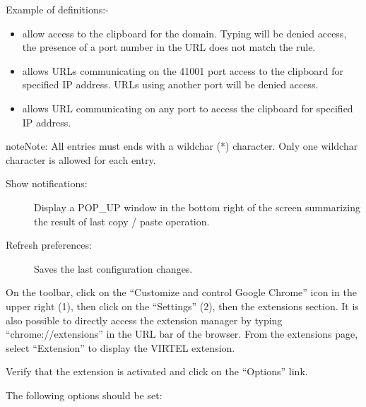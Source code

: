\documentclass[letterpaper,10pt,english]{sphinxmanual}
\begin{document}
Example of definitions:-
\begin{itemize}
\item {} 
 allow access to the clipboard for the domain. Typing   will be denied access, the presence of a port number in the URL does not match the rule.

\item {} 
 allows URLs communicating on the 41001 port access to the clipboard for specified IP address. URLs using another port will be denied access.

\item {} 
 allows URL communicating on any port to access the clipboard for specified IP address.

\end{itemize}

\begin{sphinxadmonition}{note}{Note:}
All entries must ends with a wildchar (*) character. Only one wildchar character is allowed for each entry.
\end{sphinxadmonition}
\begin{description}
\item[{Show notifications:}] \leavevmode
Display a POP\_UP window in the bottom right of the screen summarizing the result of last copy / paste operation.

\item[{Refresh preferences:}] \leavevmode
Saves the last configuration changes.

\end{description}


On the toolbar, click on the “Customize and control Google Chrome” icon in the upper right (1), then click on the “Settings” (2), then the extensions section. It is also possible to directly access the extension manager by typing “chrome://extensions” in the URL bar of the browser. From the extensions page, select “Extension” to display the VIRTEL extension.


Verify that the extension is activated and click on the “Options” link.


The following options should be set:
\end{document}
